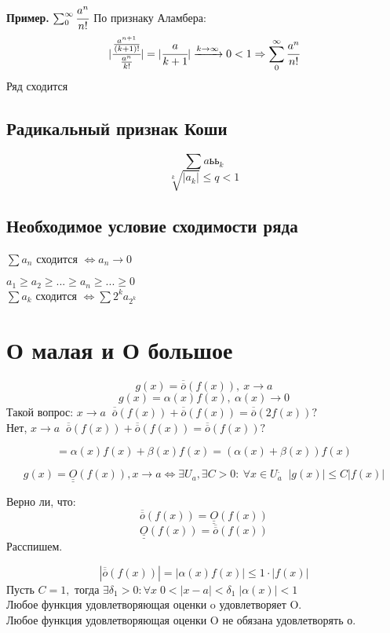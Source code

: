 \documentclass[12pt, paper]{article}
\begin{document}
\textbf{Пример.} $\sum^\infty_0 \cfrac{a^n}{n!}$
По признаку Аламбера: 
\[ |\cfrac{\frac{a^{n+1}}{(k+1)!}}{\frac{a^n}{k!}}| = |\cfrac{a}{k+1}| \xrightarrow{k\to \infty} 0 < 1\Rightarrow \sum^\infty_0 \cfrac{a^n}{n!} \]
Ряд сходится

\subsection{Радикальный признак Коши}
\begin{tcolorbox}[title=Признак Коши]
    \[ \sum aьь_k \]
    \[ \sqrt[k]{|a_k|} \leq q < 1 \]
\end{tcolorbox}

\subsection{Необходимое условие сходимости ряда}
$ \sum a_n$ сходится $\Leftrightarrow  a_n \to 0 $

$a_1 \geq a_2 \geq ... \geq a_n \geq ... \geq 0$\\
$\sum a_k$ сходится $\Leftrightarrow \sum 2^k a_{2^k}$

\section{О малая и О большое}
\[ g(x) = \overline{\overline{o}}(f(x)),\ x \to a \]
\[ g(x) = \alpha(x)f(x),\ \alpha(x) \to 0 \]
Такой вопрос: $ x \to a \;\; \overline{\overline{o}}(f(x)) + \overline{\overline{o}}(f(x)) = \overline{\overline{o}}(2f(x))?$\\
Нет, $ x \to a \;\; \overline{\overline{o}}(f(x)) + \overline{\overline{o}}(f(x)) = \overline{\overline{o}}(f(x))?$

\[ = \alpha(x)f(x) + \beta(x)f(x) = (\alpha(x) + \beta(x))f(x) \]

\[ g(x) = \underline{\underline{O}}(f(x)), x \to a \Leftrightarrow \exists U_a, \exists C > 0:\ \forall x \in U_a^{.}\;\; |g(x)| \leq C|f(x)|\]

Верно ли, что:
\[ \overline{\overline{o}}(f(x)) = \underline{\underline{O}}(f(x)) \]
\[\underline{\underline{O}}(f(x)) =\overline{\overline{o}}(f(x))  \]
Расспишем.

\[ |\overline{\overline{o}}(f(x))| = |\alpha(x)f(x)| \leq 1\cdot |f(x)|\]
Пусть $C = 1,$ тогда $\exists \delta_1 > 0: \forall x\; 0 < |x-a|<\delta_1\; |\alpha(x)| < 1$\\
Любое функция удовлетворяющая оценки o удовлетворяет O.\\
Любое функция удовлетворяющая оценки O не обязана удовлетворять о.
\end{document}
